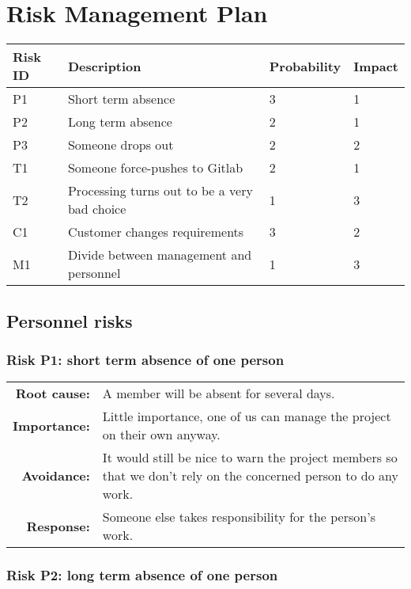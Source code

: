 \section{Risk Management Plan}

\begin{table}[h]
\small
{}
\label{table:risks}
\begin{tabularx}{\textwidth}{|l|X|l|l|}
\hline
\rowcolor{Gray} \textbf{Risk ID} & \textbf{Description} & \textbf{Probability} & \textbf{Impact} \\
\hline
P1 & Short term absence & 3 & 1 \\
\hline
P2 & Long term absence & 2 & 1 \\
\hline
P3 & Someone drops out & 2 & 2 \\
\hline
T1 & Someone force-pushes to Gitlab & 2 & 1 \\
\hline
T2 & Processing turns out to be a very bad choice & 1 & 3 \\
\hline
C1 & Customer changes requirements & 3 & 2 \\
\hline
M1 & Divide between management and personnel & 1 & 3 \\
\hline
\end{tabularx}
\end{table}

\subsection{Personnel risks}

\subsubsection{Risk P1: short term absence of one person}

\begin{tabularx}{\textwidth}{rX}
\textbf{Root cause:} & A member will be absent for several days. \\
\textbf{Importance:} & Little importance, one of us can manage the project on their own anyway. \\
\textbf{Avoidance:} & It would still be nice to warn the project members so that we don’t rely on the concerned person to do any work. \\
\textbf{Response:} & Someone else takes responsibility for the person’s work. \\
\end{tabularx}

\subsubsection{Risk P2: long term absence of one person}

